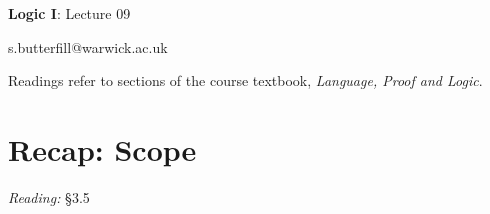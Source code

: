 \documentclass[12pt]{extarticle}
\date{}
\makeatletter
\def \ititle {Origins of Mind}
\def \isubtitle {Lecture 08}
\def \iemail{s.butterfill@warwick.ac.uk}
\makeatother
\begin{document}

\begin{multicols*}{3}

\setlength\footnotesep{1em}








\def \ititle {Logic I}
 
\def \isubtitle {Lecture 09}
 
\begin{center}
 
{\Large
 
\textbf{\ititle}: \isubtitle
 
}
 
 
 
\iemail %
 
\end{center}
 
Readings refer to sections of the course textbook, \emph{Language, Proof and Logic}.
 
 
 
\section{Recap: Scope}
 
\emph{Reading:} §3.5
 

\end{multicols*}
\end{document}
